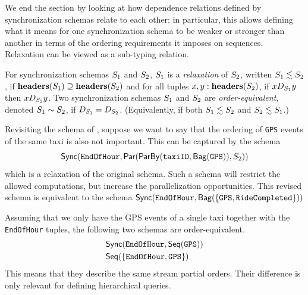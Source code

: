 We end the section by looking at how dependence relations defined
by synchronization schemas relate to each other: in particular, this allows defining what it means
for one synchronization schema to be weaker or stronger than another in terms of the ordering requirements it imposes on sequences.
Relaxation can be viewed as a sub-typing relation.

\begin{definition}
    \label{45:def:schema-relaxation}
    \label{45:def:schema-equivalence}
    For synchronization schemas $\ss_1$ and $\ss_2$,  $\ss_1$ is a \emph{relaxation} of $\ss_2$, written $\ss_1 \lesssim \ss_2$, if
    $\headers(\ss_1) \supseteq \headers(\ss_2)$
    and for all tuples $x, y: \headers(\ss_2)$,
    if $x D_{\ss_1} y$ then $x D_{\ss_2} y$.
    Two synchronization schemas $\ss_1$ and $\ss_2$ are \emph{order-equivalent}, denoted $\ss_1 \sim \ss_2$, if $D_{\ss_1} = D_{\ss_2}$.
    (Equivalently, if both $\ss_1 \lesssim \ss_2$ and $\ss_2 \lesssim \ss_1$.)
    \end{definition}

\begin{example}
Revisiting the schema of , suppose we want to say that
the ordering of \texttt{GPS} events of the same taxi is also not important.
This can be captured by the schema
$$
\hier
    {\texttt{EndOfHour}}
    {\parcomp
        {\keyby
            {\texttt{taxiID}}
            {\relleaf{\texttt{GPS}}}}
        {\ss_2}}
$$
which is a relaxation of the original schema.
Such a schema will
restrict the allowed computations, but increase the parallelization opportunities.
This revised schema is equivalent to the schema
$\hier{\texttt{EndOfHour}}{\relleaf{\{\texttt{GPS},\texttt{RideCompleted} \}}}$

Assuming that we only have the GPS events of a single taxi together with the \texttt{EndOfHour} tuples, the following two schemas are order-equivalent.
\begin{align*}
    & \hier
        { \texttt{EndOfHour}  }
        {\seqleaf
            {  \texttt{GPS} }} \\
    & \seqleaf
        {\{ \texttt{EndOfHour}, \texttt{GPS} \} }
\end{align*}
This means that they describe the same stream partial orders. Their difference is only relevant for defining hierarchical queries.
\end{example}

